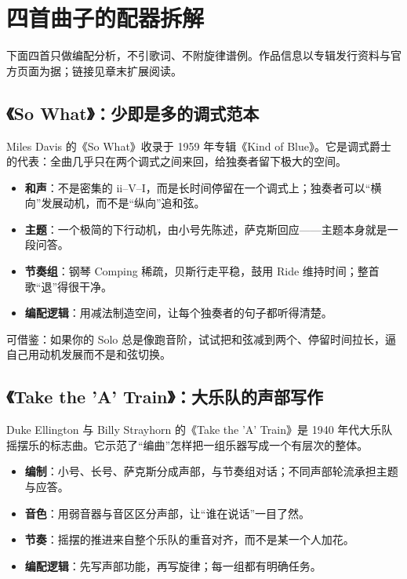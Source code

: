 \section{四首曲子的配器拆解}
\label{sec:jazz-cases}

下面四首只做编配分析，不引歌词、不附旋律谱例。作品信息以专辑发行资料与官方页面为据；链接见章末扩展阅读。

\subsection{《So What》：少即是多的调式范本}
\label{sec:jazz-case-so-what}

Miles Davis 的《So What》收录于 1959 年专辑《Kind of Blue》。它是调式爵士的代表：全曲几乎只在两个调式之间来回，给独奏者留下极大的空间。

\begin{itemize}
\item \textbf{和声}：不是密集的 ii–V–I，而是长时间停留在一个调式上；独奏者可以“横向”发展动机，而不是“纵向”追和弦。
\item \textbf{主题}：一个极简的下行动机，由小号先陈述，萨克斯回应——主题本身就是一段问答。
\item \textbf{节奏组}：钢琴 Comping 稀疏，贝斯行走平稳，鼓用 Ride 维持时间；整首歌“退”得很干净。
\item \textbf{编配逻辑}：用减法制造空间，让每个独奏者的句子都听得清楚。
\end{itemize}

可借鉴：如果你的 Solo 总是像跑音阶，试试把和弦减到两个、停留时间拉长，逼自己用动机发展而不是和弦切换。

\subsection{《Take the 'A' Train》：大乐队的声部写作}
\label{sec:jazz-case-a-train}

Duke Ellington 与 Billy Strayhorn 的《Take the 'A' Train》是 1940 年代大乐队摇摆乐的标志曲。它示范了“编曲”怎样把一组乐器写成一个有层次的整体。

\begin{itemize}
\item \textbf{编制}：小号、长号、萨克斯分成声部，与节奏组对话；不同声部轮流承担主题与应答。
\item \textbf{音色}：用弱音器与音区区分声部，让“谁在说话”一目了然。
\item \textbf{节奏}：摇摆的推进来自整个乐队的重音对齐，而不是某一个人加花。
\item \textbf{编配逻辑}：先写声部功能，再写旋律；每一组都有明确任务。
\end{itemize}

